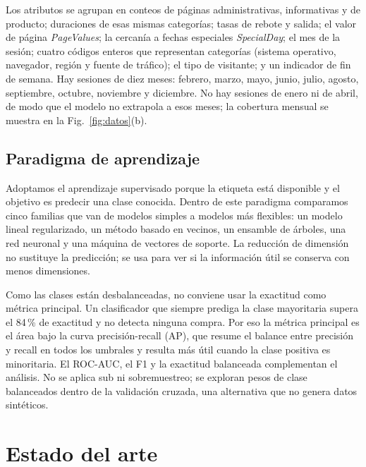 \documentclass[journal]{IEEEtran}
\begin{document}
Los atributos se agrupan en conteos de páginas administrativas, informativas y de
producto; duraciones de esas mismas categorías; tasas de rebote y salida; el valor de
página \textit{PageValues}; la cercanía a fechas especiales \textit{SpecialDay}; el mes
de la sesión; cuatro códigos enteros que representan categorías (sistema operativo,
navegador, región y fuente de tráfico); el tipo de visitante; y un indicador de fin de
semana. Hay sesiones de diez meses: febrero, marzo, mayo, junio, julio, agosto,
septiembre, octubre, noviembre y diciembre. No hay sesiones de enero ni de abril, de modo
que el modelo no extrapola a esos meses; la cobertura mensual se muestra en la
Fig.~\ref{fig:datos}(b).

\subsection{Paradigma de aprendizaje}

Adoptamos el aprendizaje supervisado porque la etiqueta está disponible y el objetivo es
predecir una clase conocida. Dentro de este paradigma comparamos cinco familias que
van de modelos simples a modelos más flexibles: un modelo lineal regularizado, un método
basado en vecinos, un ensamble de árboles, una red neuronal y una máquina de vectores de
soporte. La reducción de dimensión no sustituye la predicción; se usa para ver si la
información útil se conserva con menos dimensiones.

Como las clases están desbalanceadas, no conviene usar la exactitud como métrica principal. Un clasificador que
siempre prediga la clase mayoritaria supera el 84\,\% de exactitud y no detecta ninguna
compra. Por eso la métrica principal es el área bajo la curva precisión-recall (AP), que
resume el balance entre precisión y recall en todos los umbrales y resulta más útil
cuando la clase positiva es minoritaria. El ROC-AUC, el F1 y la exactitud balanceada
complementan el análisis. No se aplica sub ni sobremuestreo; se exploran pesos de clase
balanceados dentro de la validación cruzada, una alternativa que no genera datos
sintéticos.

\section{Estado del arte}
\label{sec:estado}
\end{document}
